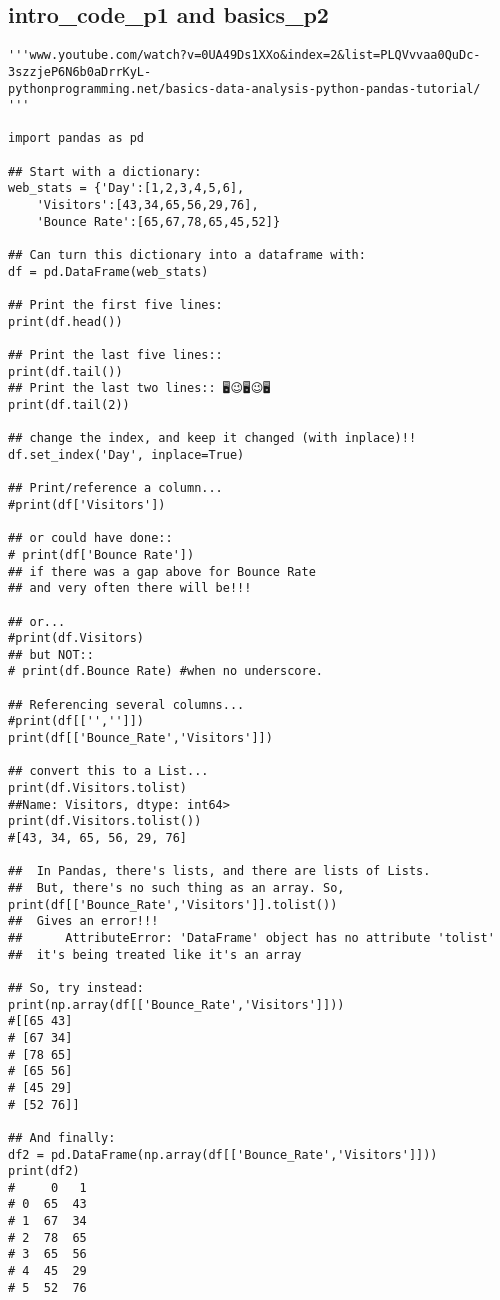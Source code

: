 \documentclass[11pt,a4paper]{article}
\begin{document}
\subsection{intro\_code\_p1 and basics\_p2}
\smallskip
\smallskip
\noindent 
\begin{lstlisting}
'''www.youtube.com/watch?v=0UA49Ds1XXo&index=2&list=PLQVvvaa0QuDc-3szzjeP6N6b0aDrrKyL-
pythonprogramming.net/basics-data-analysis-python-pandas-tutorial/
'''

import pandas as pd

## Start with a dictionary: 
web_stats = {'Day':[1,2,3,4,5,6],
    'Visitors':[43,34,65,56,29,76],
    'Bounce Rate':[65,67,78,65,45,52]}

## Can turn this dictionary into a dataframe with:
df = pd.DataFrame(web_stats)

## Print the first five lines:
print(df.head())

## Print the last five lines::
print(df.tail())
## Print the last two lines:: 🖥😉🖥️️😉🖥️
print(df.tail(2))

## change the index, and keep it changed (with inplace)!! 
df.set_index('Day', inplace=True)

## Print/reference a column... 
#print(df['Visitors'])

## or could have done::
# print(df['Bounce Rate'])
## if there was a gap above for Bounce Rate 
## and very often there will be!!!

## or...
#print(df.Visitors)
## but NOT::
# print(df.Bounce Rate) #when no underscore.

## Referencing several columns...
#print(df[['','']])
print(df[['Bounce_Rate','Visitors']])

## convert this to a List...
print(df.Visitors.tolist)
##Name: Visitors, dtype: int64>
print(df.Visitors.tolist())
#[43, 34, 65, 56, 29, 76]

##  In Pandas, there's lists, and there are lists of Lists.
##  But, there's no such thing as an array. So, 
print(df[['Bounce_Rate','Visitors']].tolist())
##  Gives an error!!!
##      AttributeError: 'DataFrame' object has no attribute 'tolist'
##  it's being treated like it's an array

## So, try instead:
print(np.array(df[['Bounce_Rate','Visitors']]))
#[[65 43]
# [67 34]
# [78 65]
# [65 56]
# [45 29]
# [52 76]]

## And finally:
df2 = pd.DataFrame(np.array(df[['Bounce_Rate','Visitors']]))
print(df2)
#     0   1
# 0  65  43
# 1  67  34
# 2  78  65
# 3  65  56
# 4  45  29
# 5  52  76
\end{lstlisting}
\clearpage
\end{document}
